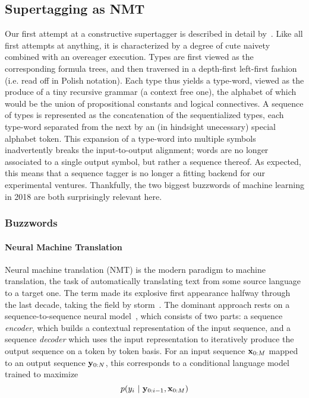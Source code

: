 \subsection{Supertagging as NMT}
Our first attempt at a constructive supertagger is described in detail by~\citet{kogkalidis-etal-2019-constructive}.
Like all first attempts at anything, it is characterized by a degree of cute naivety combined with an overeager execution.
Types are first viewed as the corresponding formula trees, and then traversed in a depth-first left-first fashion (i.e. read off in Polish notation).
Each type thus yields a type-word, viewed as the produce of a tiny recursive grammar (a context free one), the alphabet of which would be the union of propositional constants and logical connectives.
A sequence of types is represented as the concatenation of the sequentialized types, each type-word separated from the next by an (in hindsight unecessary) special alphabet token.
This expansion of a type-word into multiple symbols inadvertently breaks the input-to-output alignment; words are no longer associated to a single output symbol, but rather a sequence thereof.
As expected, this means that a sequence tagger is no longer a fitting backend for our experimental ventures.
Thankfully, the two biggest buzzwords of machine learning in 2018 are both surprisingly relevant here.

\subsubsection{Buzzwords}
\paragraph{Neural Machine Translation} Neural machine translation (NMT) is the modern paradigm to machine translation, the task of automatically translating text from some source language to a target one.
The term made its explosive first appearance halfway through the last decade, taking the field by storm~\cite{kalchbrenner2013recurrent,cho2014learning,bahdanau2015neural}.
The dominant approach rests on a sequence-to-sequence neural model~\cite{cho2014learning,NIPS2014_a14ac55a}, which consists of two parts: a sequence \textit{encoder}, which builds a contextual representation of the input sequence, and a sequence \textit{decoder} which uses the input representation to iteratively produce the output sequence on a token by token basis.
For an input sequence $\mathbf{x}_{0:M}$ mapped to an output sequence $\mathbf{y}_{0:N}$, this corresponds to a conditional language model trained to maximize
\begin{equation}
	p(y_i \ | \ \seq{y}{0:i-1},\seq{x}{0:M})
\end{equation}

